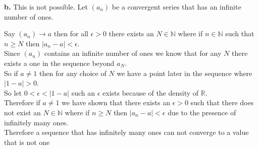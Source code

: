 \documentclass{article}
\begin{document}
{\Large \textbf{b.}} This is not possible. Let $(a_n)$ be a convergent series that has an infinite number of ones.
\begin{center}
    \doublespacing
    Say $(a_n)\rightarrow a$ then for all $\epsilon > 0$ there exists an $N\in\mathbb{N}$ where if $n\in\mathbb{N}$ such that $n\geq N$ then $|a_n - a| <\epsilon$.
    \\Since $(a_n)$ contains an infinite number of ones we know that for any $N$ there exists a one in the sequence beyond $a_N$.
    \\So if $a\neq 1$ then for any choice of $N$ we have a point later in the sequence where $|1 - a| > 0$.
    \\So let $0 <\epsilon < |1 - a|$ such an $\epsilon$ exists because of the density of $\mathbb{R}$.
    \\Therefore if $a\neq 1$ we have shown that there exists an $\epsilon > 0$ such that there does not exist an $N\in\mathbb{N}$ where if $n\geq N$ then $|a_n - a| <\epsilon$ due to the presence of infinitely many ones.
    \\Therefore a sequence that has infinitely many ones can not converge to a value that is not one \qedsymbol
\end{center}
\end{document}
